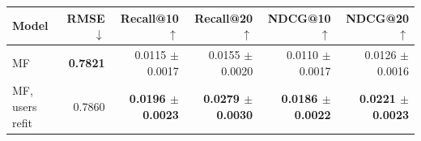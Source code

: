 \begin{tabular}{lrrrrr}
\toprule
Model & RMSE $\downarrow$ & Recall@10 $\uparrow$ & Recall@20 $\uparrow$ & NDCG@10 $\uparrow$ & NDCG@20 $\uparrow$ \\
\midrule
MF & \textbf{0.7821} & 0.0115 $\pm$ 0.0017 & 0.0155 $\pm$ 0.0020 & 0.0110 $\pm$ 0.0017 & 0.0126 $\pm$ 0.0016 \\
MF, users refit & 0.7860 & \textbf{0.0196 $\pm$ 0.0023} & \textbf{0.0279 $\pm$ 0.0030} & \textbf{0.0186 $\pm$ 0.0022} & \textbf{0.0221 $\pm$ 0.0023} \\
\bottomrule
\end{tabular}
